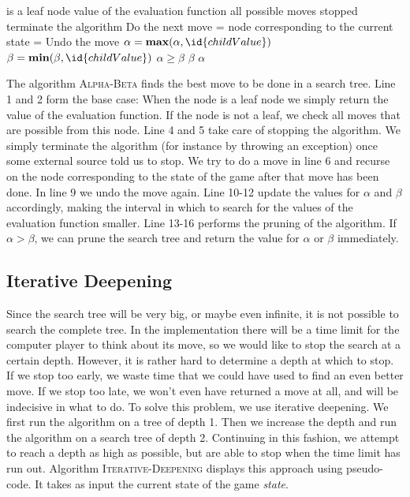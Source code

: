 \documentclass[10pt,a4paper]{article}
\begin{document}
\begin{codebox}
\li \If {} is a leaf node
\li	\Then
		\Return value of the evaluation function
	\End
\li \For all possible moves
\li	\Do
 		\If stopped
\li 	\Then
 			terminate the algorithm
 		\End
\li Do the next move
\li {} = node corresponding to the current state
\li {} = 
\li Undo the move
\li \If {}
\li \Then
	 $\alpha = \textbf{max}(\alpha, \id{childValue})$
\li \Else
	$\beta = \textbf{min}(\beta,\id{childValue})$
	\End
\li \If $\alpha \geq \beta$
\li 	\Then \If {}
\li			\Then \Return $\beta$
\li		\Else
			\Return $\alpha$
		\End
	\End
\End
\end{codebox}

The algorithm \textsc{Alpha-Beta} finds the best move to be done in a search tree. Line 1 and 2 form the base case: When the node is a leaf node we simply return the value of the evaluation function. If the node is not a leaf, we check all moves that are possible from this node. Line 4 and 5 take care of stopping the algorithm. We simply terminate the algorithm (for instance by throwing an exception) once some external source told us to stop. We try to do a move in line 6 and recurse on the node corresponding to the state of the game after that move has been done. In line 9 we undo the move again. Line 10-12 update the values for $\alpha$ and $\beta$ accordingly, making the interval in which to search for the values of the evaluation function smaller. Line 13-16 performs the pruning of the algorithm. If $\alpha > \beta$, we can prune the search tree and return the value for $\alpha$ or $\beta$ immediately.

\subsection{Iterative Deepening}
Since the search tree will be very big, or maybe even infinite, it is not possible to search the complete tree. In the implementation there will be a time limit for the computer player to think about its move, so we would like to stop the search at a certain depth. However, it is rather hard to determine a depth at which to stop. If we stop too early, we waste time that we could have used to find an even better move. If we stop too late, we won't even have returned a move at all, and will be indecisive in what to do. To solve this problem, we use iterative deepening. We first run the algorithm on a tree of depth 1. Then we increase the depth and run the algorithm on a search tree of depth 2. Continuing in this fashion, we attempt to reach a depth as high as possible, but are able to stop when the time limit has run out. Algorithm \textsc{Iterative-Deepening} displays this approach using pseudo-code. It takes as input the current state of the game \emph{state}.
\end{document}
